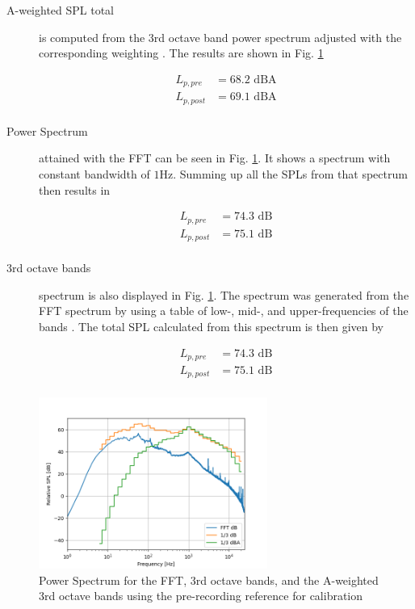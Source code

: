 \documentclass[twocolumn]{article}
\begin{document}
\begin{description}
\item[A-weighted SPL total] is computed from the 3rd octave band power spectrum adjusted with the
    corresponding weighting \cite{1}.
    The results are shown in Fig. \ref{fig:power_spectrum}

\begin{equation}
\begin{aligned}
    L_{p,pre} & = 68.2 \textrm{ dBA} \\
    L_{p,post} & = 69.1 \textrm{ dBA} \\
\end{aligned}
\end{equation}

\item[Power Spectrum] attained with the FFT can be seen in Fig. \ref{fig:power_spectrum}.
    It shows a spectrum with constant bandwidth of $1\textrm{Hz}$.
    Summing up all the SPLs from that spectrum then results in

\begin{equation}
\begin{aligned}
    L_{p,pre} & = 74.3 \textrm{ dB} \\
    L_{p,post} & = 75.1 \textrm{ dB} \\
\end{aligned}
\end{equation}

\item[3rd octave bands] spectrum is also displayed in Fig. \ref{fig:power_spectrum}.
    The spectrum was generated from the FFT spectrum by using a table of low-, mid-, and
    upper-frequencies of the bands \cite{2}.
    The total SPL calculated from this spectrum is then given by

\begin{equation}
\begin{aligned}
    L_{p,pre} & = 74.3 \textrm{ dB} \\
    L_{p,post} & = 75.1 \textrm{ dB} \\
\end{aligned}
\end{equation}

\end{description}

\begin{figure}[H]
    \centering
    \includegraphics[width=75mm]{./Images/spectrum_plot_step.png}
    \caption{Power Spectrum for the FFT, 3rd octave bands, and the A-weighted 3rd octave bands using the
    pre-recording reference for calibration}
    \label{fig:power_spectrum}
\end{figure}
\end{document}
